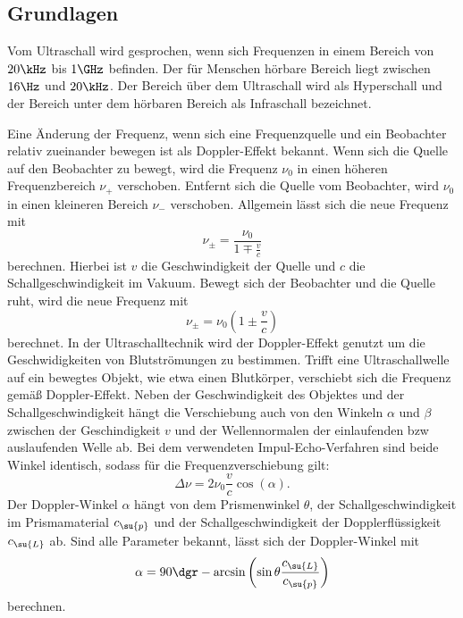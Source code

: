 \subsection{Grundlagen}
Vom Ultraschall wird gesprochen, wenn sich Frequenzen in einem Bereich von
$20\kHz$ bis $1\GHz$ befinden. Der für Menschen hörbare Bereich liegt zwischen
$16\Hz$ und $20\kHz$. Der Bereich über dem Ultraschall wird als Hyperschall und
der Bereich unter dem hörbaren Bereich als Infraschall bezeichnet.

Eine Änderung der Frequenz, wenn sich eine Frequenzquelle und ein Beobachter
relativ zueinander bewegen ist als Doppler-Effekt bekannt. Wenn sich die Quelle
auf den Beobachter zu bewegt, wird die Frequenz $\nu_0$ in einen höheren
Frequenzbereich $\nu_+$ verschoben. Entfernt sich die Quelle vom Beobachter,
wird $\nu_0$ in einen kleineren Bereich $\nu_-$ verschoben. Allgemein lässt
sich die neue Frequenz mit
\begin{equation}
  \nu_\pm = \frac{\nu_0}{1\mp\frac{v}{c}}
\end{equation}
berechnen. Hierbei ist $v$ die Geschwindigkeit der Quelle und $c$ die
Schallgeschwindigkeit im Vakuum.
Bewegt sich der Beobachter und die Quelle ruht, wird die neue Frequenz mit
\begin{equation}
  \nu_\pm=\nu_0\left(1\pm\frac{v}{c}\right)
\end{equation}
berechnet. In der Ultraschalltechnik wird der Doppler-Effekt genutzt um die
Geschwidigkeiten von Blutströmungen zu bestimmen. Trifft eine Ultraschallwelle
auf ein bewegtes Objekt, wie etwa einen Blutkörper, verschiebt sich die Frequenz
gemäß Doppler-Effekt. Neben der Geschwindigkeit des Objektes und der
Schallgeschwindigkeit hängt die Verschiebung auch von den Winkeln $\alpha$ und
$\beta$ zwischen der Geschindigkeit $v$ und der Wellennormalen der einlaufenden
bzw auslaufenden Welle ab. Bei dem verwendeten Impul-Echo-Verfahren sind beide
Winkel identisch, sodass für die Frequenzverschiebung gilt:
\begin{equation}
  \Delta\nu = 2\nu_0\frac{v}{c}\cos(\alpha).
  \label{eqn:deltanu}
\end{equation}
Der Doppler-Winkel $\alpha$ hängt von dem Prismenwinkel $\theta$, der
Schallgeschwindigkeit im Prismamaterial $c_\su{p}$ und der Schallgeschwindigkeit
der Dopplerflüssigkeit $c_\su{L}$ ab. Sind alle Parameter bekannt, lässt sich
der Doppler-Winkel mit
\begin{equation}
  \alpha = 90\dgr -\arcsin\left(\sin\theta\frac{c_\su{L}}{c_\su{p}}\right)
  \label{eqn:alpha}
\end{equation}
berechnen.
